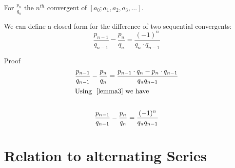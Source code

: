 \documentclass[a4paper]{article}
\begin{document}
    \begin{lemma}
        \label{lemma2}
        For $\frac{p_{n}}{q_n}$ the $n^{th}$ convergent of $[a_0; a_1, a_2, a_3, \dots]$.

        We can define a closed form for the difference of two sequential convergents:
        \[
        \frac{p_{n-1}}{q_{n-1}} - \frac{p_{n}}{q_n} = \frac{(-1)^n}{q_n \cdot q_{n-1}}
        \]

        Proof
        \begin{gather*}
            \frac{p_{n-1}}{q_{n-1}} - \frac{p_{n}}{q_n}
            = \frac{p_{n-1} \cdot q_n - p_{n} \cdot q_{n-1}}{q_{n} q_{n-1}}  \\
            \shortintertext{Using ~\ref{lemma3} we have} \\
            \frac{p_{n-1}}{q_{n-1}} - \frac{p_{n}}{q_n} = \frac{(-1)^n}{q_{n} q_{n-1}}
        \end{gather*}
    \end{lemma}

    \section{Relation to alternating Series}\label{sec:relation-to-alternating-series}
\end{document}
